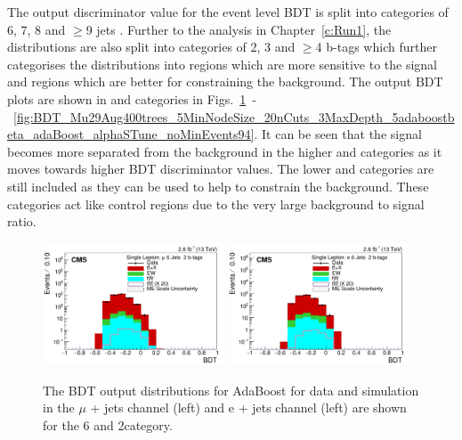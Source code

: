 The output discriminator value for the event level BDT is split into \njets categories of 6, 7, 8 and $\geq$9 jets . Further to the \runone analysis in Chapter~\ref{c:Run1}, the distributions are also split into \nMtags categories of 2, 3 and $\geq$4 b-tags which further categorises the distributions into regions which are more sensitive to the signal and regions which are better for constraining the background.
The output BDT plots are shown in \njets and \nMtags categories in Figs.~\ref{fig:BDT_Mu29Aug400trees_5MinNodeSize_20nCuts_3MaxDepth_5adaboostbeta_adaBoost_alphaSTune_noMinEvents62}~-~\ref{fig:BDT_Mu29Aug400trees_5MinNodeSize_20nCuts_3MaxDepth_5adaboostbeta_adaBoost_alphaSTune_noMinEvents94}. It can be seen that the signal becomes more separated from the background in the higher \njets and \nMtags categories as it moves towards higher BDT discriminator values. The lower \njets and \nMtags categories are still included as they can be used to help to constrain the \ttbar background. These categories act like control regions due to the very large background to signal ratio.

\begin{figure}[ht!]
    \includegraphics[width=0.48\textwidth]{images/Run2/BDT_Mu29Aug400trees_5MinNodeSize_20nCuts_3MaxDepth_5adaboostbeta_adaBoost_alphaSTune_noMinEvents6nJets2nMtags_StackLogY.pdf}
    \includegraphics[width=0.48\textwidth]{images/Run2/BDT_El29Aug400trees_5MinNodeSize_20nCuts_3MaxDepth_5adaboostbeta_adaBoost_alphaSTune_noMinEvents6nJets2nMtags_StackLogY.pdf} 
    \caption{The BDT output distributions for AdaBoost for data and simulation in the $\mu$ + jets channel (left) and e + jets channel (left) are shown for the 6 \njets and 2\nMtags category.}
    \label{fig:BDT_Mu29Aug400trees_5MinNodeSize_20nCuts_3MaxDepth_5adaboostbeta_adaBoost_alphaSTune_noMinEvents62}
\end{figure}

